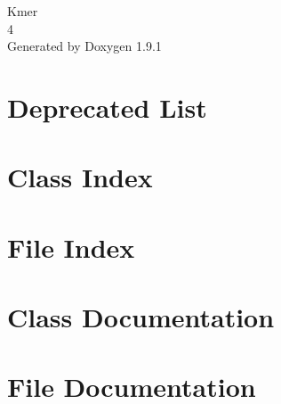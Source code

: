 \let\mypdfximage\pdfximage\def\pdfximage{\immediate\mypdfximage}\documentclass[twoside]{book}
\newcommand{\+}{\discretionary{\mbox{\scriptsize$\hookleftarrow$}}{}{}}
\newcommand{\clearemptydoublepage}{%
  \newpage{\pagestyle{empty}\cleardoublepage}%
}
\begin{document}
\raggedbottom

\hypersetup{pageanchor=false,
             bookmarksnumbered=true,
             pdfencoding=unicode
            }
\begin{titlepage}
\vspace*{7cm}
\begin{center}%
{\Large Kmer \\[1ex]\large 4 }\\
\vspace*{1cm}
{\large Generated by Doxygen 1.9.1}\\
\end{center}
\end{titlepage}
\clearemptydoublepage
{}
\tableofcontents
\clearemptydoublepage
{}
\hypersetup{pageanchor=true}

\chapter{Deprecated List}
\label{deprecated}

\chapter{Class Index}

\chapter{File Index}

\chapter{Class Documentation}



\chapter{File Documentation}








\backmatter
\newpage
{}
\clearemptydoublepage
{}
\printindex
\end{document}
